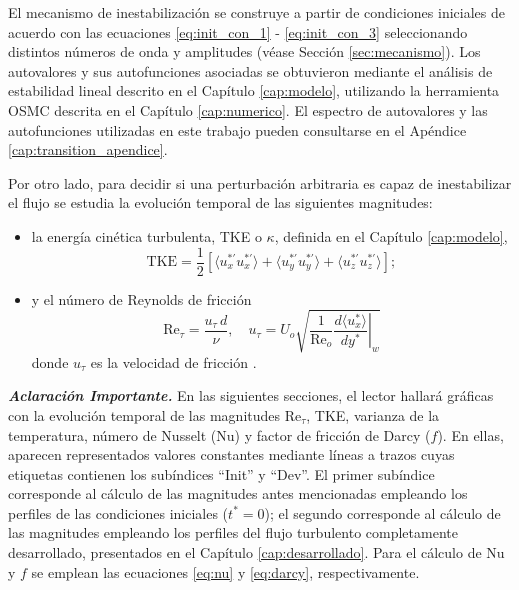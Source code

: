 El mecanismo de inestabilización se construye a partir de condiciones iniciales de acuerdo con las ecuaciones \ref{eq:init_con_1} - \ref{eq:init_con_3} seleccionando distintos números de onda y amplitudes (véase Sección \ref{sec:mecanismo}). Los autovalores y sus autofunciones asociadas se obtuvieron mediante el análisis de estabilidad lineal descrito en el Capítulo \ref{cap:modelo}, utilizando la herramienta OSMC descrita en el Capítulo \ref{cap:numerico}. El espectro de autovalores y las autofunciones utilizadas en este trabajo pueden consultarse en el Apéndice \ref{cap:transition_apendice}. 

Por otro lado, para decidir si una perturbación arbitraria es capaz de inestabilizar el flujo se estudia la evolución temporal de las siguientes magnitudes:

\begin{itemize}
  \item la energía cinética turbulenta, TKE o $\kappa$, definida en el Capítulo \ref{cap:modelo},
  	\begin{equation*}
  		\text{TKE} = \frac{1}{2} \left[ \langle u^{* \prime}_x u^{* \prime}_x \rangle + \langle u^{* \prime}_y u^{* \prime}_y \rangle + \langle u^{* \prime}_z u^{* \prime}_z \rangle \right] ; 
  	\end{equation*}
  	
  

  \item y el número de Reynolds de fricción
        $$
          \text{Re}_{\tau} = \frac{u_{\tau}\,d}{\nu} , \quad u_{\tau}= U_o \sqrt{ \frac{1}{\text{Re}_o} \left. \frac{d \langle u^*_x \rangle}{dy^*} \right\vert_w }
        $$
        donde $u_{\tau}$ es la velocidad de fricción \cite{pope2001turbulent}.
\end{itemize}

\begin{table}[H]
\centering
{}
\caption{Parámetros adimensionales de los dos casos elegidos.}
\label{tab:cases}
\end{table}

\textit{\textbf{Aclaración Importante.}} En las siguientes secciones, el lector hallará gráficas con la evolución temporal de las magnitudes  Re$_{\tau}$, TKE, varianza de la temperatura, número de Nusselt (Nu) y factor de fricción de Darcy ($f$). En ellas, aparecen representados valores \linebreak constantes mediante líneas a trazos cuyas etiquetas contienen los subíndices ``Init'' y ``Dev''. El primer subíndice corresponde al cálculo de las magnitudes antes mencionadas empleando los perfiles de las condiciones iniciales ($t^*=0$); el segundo corresponde al cálculo de las magnitudes empleando los perfiles del flujo turbulento completamente desarrollado, presentados en el Capítulo \ref{cap:desarrollado}. Para el cálculo de Nu y $f$ se emplean las ecuaciones \ref{eq:nu} y \ref{eq:darcy}, respectivamente.

